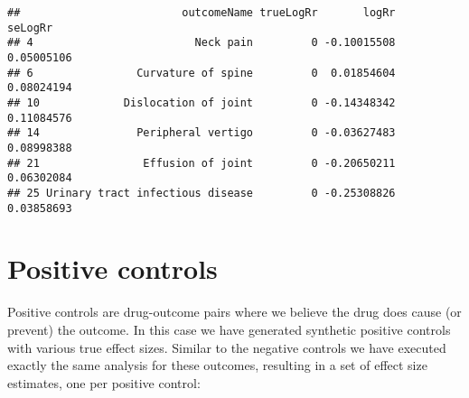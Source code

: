 \documentclass[
]{article}
\newenvironment{Shaded}{\begin{snugshade}}{\end{snugshade}}
\newcommand{\DecValTok}[1]{\textcolor[rgb]{0.00,0.00,0.81}{#1}}
\newcommand{\KeywordTok}[1]{\textcolor[rgb]{0.13,0.29,0.53}{\textbf{#1}}}
\newcommand{\NormalTok}[1]{#1}
\newcommand{\OperatorTok}[1]{\textcolor[rgb]{0.81,0.36,0.00}{\textbf{#1}}}
\newcommand{\StringTok}[1]{\textcolor[rgb]{0.31,0.60,0.02}{#1}}
\begin{document}
\begin{Shaded}
\end{Shaded}

\begin{verbatim}
##                         outcomeName trueLogRr       logRr    seLogRr
## 4                         Neck pain         0 -0.10015508 0.05005106
## 6                Curvature of spine         0  0.01854604 0.08024194
## 10             Dislocation of joint         0 -0.14348342 0.11084576
## 14               Peripheral vertigo         0 -0.03627483 0.08998388
## 21                Effusion of joint         0 -0.20650211 0.06302084
## 25 Urinary tract infectious disease         0 -0.25308826 0.03858693
\end{verbatim}

\hypertarget{positive-controls}{%
\section{Positive controls}\label{positive-controls}}

Positive controls are drug-outcome pairs where we believe the drug does
cause (or prevent) the outcome. In this case we have generated synthetic
positive controls with various true effect sizes. Similar to the
negative controls we have executed exactly the same analysis for these
outcomes, resulting in a set of effect size estimates, one per positive
control:

\begin{Shaded}
\end{Shaded}
\end{document}
